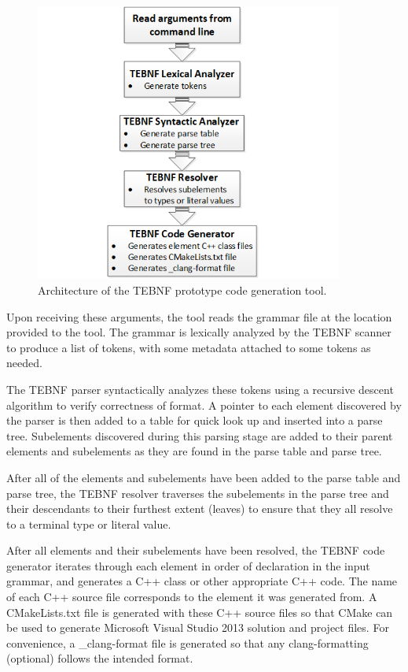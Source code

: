 \begin{figure}[h!]
\centering
\includegraphics[width=0.9\textwidth]{figures/TEBNFCodeGenToolArchitecture.png}
\caption{Architecture of the TEBNF prototype code generation tool.}
\label{fig:TEBNFCodeGenToolArchitecture}
\end{figure}

\indent
Upon receiving these arguments, the tool reads the grammar file at the location provided to the tool.  The grammar is lexically analyzed by the TEBNF scanner to produce a list of tokens, with some metadata attached to some tokens as needed.

\indent
The TEBNF parser syntactically analyzes these tokens using a recursive descent algorithm to verify correctness of format.  A pointer to each element discovered by the parser is then added to a table for quick look up and inserted into a parse tree.  Subelements discovered during this parsing stage are added to their parent elements and subelements as they are found in the parse table and parse tree.

\indent
After all of the elements and subelements have been added to the parse table and parse tree, the TEBNF resolver traverses the subelements in the parse tree and their descendants to their furthest extent (leaves) to ensure that they all resolve to a terminal type or literal value.

\indent
After all elements and their subelements have been resolved, the TEBNF code generator iterates through each element in order of declaration in the input grammar, and generates a C++ class or other appropriate C++ code.  The name of each C++ source file corresponds to the element it was generated from.  A CMakeLists.txt file is generated with these C++ source files so that CMake can be used to generate Microsoft Visual Studio 2013 solution and project files.  For convenience, a \_clang-format file is generated so that any clang-formatting (optional) follows the intended format.


